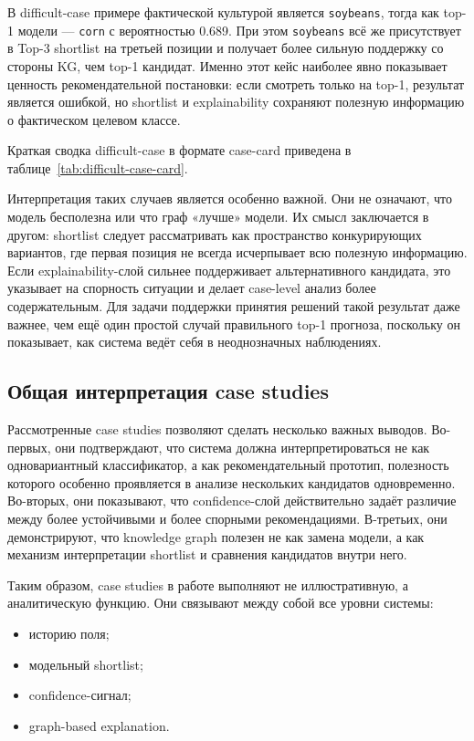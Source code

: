 В difficult-case примере фактической культурой является \texttt{soybeans}, тогда как top-1 модели --- \texttt{corn} с
вероятностью 0.689. При этом \texttt{soybeans} всё же присутствует в Top-3 shortlist на третьей позиции и получает
более сильную поддержку со стороны KG, чем top-1 кандидат. Именно этот кейс наиболее явно показывает ценность
рекомендательной постановки: если смотреть только на top-1, результат является ошибкой, но shortlist и explainability
сохраняют полезную информацию о фактическом целевом классе.

Краткая сводка difficult-case в формате case-card приведена в таблице~\ref{tab:difficult-case-card}.



Интерпретация таких случаев является особенно важной. Они не означают, что модель бесполезна или что граф «лучше»
модели. Их смысл заключается в другом: shortlist следует рассматривать как пространство конкурирующих вариантов, где
первая позиция не всегда исчерпывает всю полезную информацию. Если explainability-слой сильнее поддерживает
альтернативного кандидата, это указывает на спорность ситуации и делает case-level анализ более содержательным. Для
задачи поддержки принятия решений такой результат даже важнее, чем ещё один простой случай правильного top-1 прогноза,
поскольку он показывает, как система ведёт себя в неоднозначных наблюдениях.

\subsection{Общая интерпретация case studies}

Рассмотренные case studies позволяют сделать несколько важных выводов. Во-первых, они подтверждают, что система должна
интерпретироваться не как одновариантный классификатор, а как рекомендательный прототип, полезность которого особенно
проявляется в анализе нескольких кандидатов одновременно. Во-вторых, они показывают, что confidence-слой действительно
задаёт различие между более устойчивыми и более спорными рекомендациями. В-третьих, они демонстрируют, что knowledge
graph полезен не как замена модели, а как механизм интерпретации shortlist и сравнения кандидатов внутри него.

Таким образом, case studies в работе выполняют не иллюстративную, а аналитическую функцию. Они связывают между собой все
уровни системы:

\begin{itemize}
\tightlist
\item
  историю поля;
\item
  модельный shortlist;
\item
  confidence-сигнал;
\item
  graph-based explanation.
\end{itemize}


